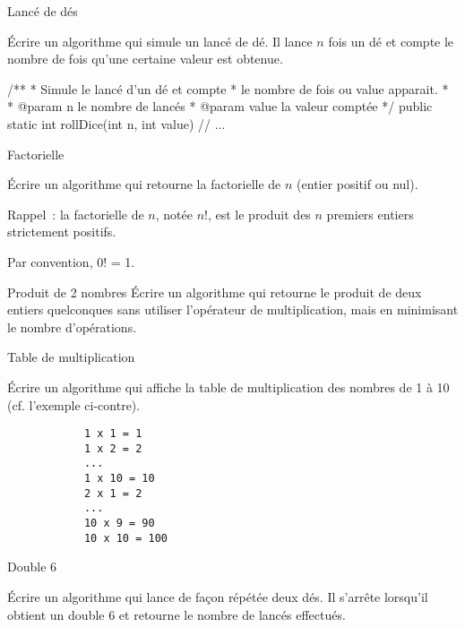 	\begin{Exercice}{Lancé de dés}

		Écrire un algorithme qui simule un lancé de dé. Il lance $n$ fois un dé
		et compte le nombre de fois qu’une certaine valeur est obtenue.

		\begin{java}
/**
 * Simule le lancé d'un dé et compte
 * le nombre de fois ou value apparait.
 * 
 * @param n le nombre de lancés
 * @param value la valeur comptée
 */
public static int rollDice(int n, int value){
	// ...
}
		\end{java}
	
	\end{Exercice}

	\begin{Exercice}{Factorielle}

		Écrire un algorithme qui retourne la factorielle de $n$ (entier positif ou
		nul). 
		
		Rappel~: la factorielle de $n$, notée $n$!, est le produit des $n$
		premiers entiers strictement positifs. 

		Par convention, 0! = 1.
	\end{Exercice}

	\begin{Exercice}{Produit de 2 nombres}
		Écrire un algorithme qui retourne le produit de deux entiers quelconques
		sans utiliser l’opérateur de multiplication, mais en minimisant le
		nombre d’opérations.
	\end{Exercice}

	\begin{Exercice}{Table de multiplication}

		\begin{minipage}[t]{10cm}
			Écrire un algorithme qui affiche la table de multiplication
			des nombres de 1 à 10
			(cf. l’exemple ci-contre).

		\end{minipage}
		\qquad
		\begin{minipage}[t]{4cm}
			\begin{verbatim}
			1 x 1 = 1
			1 x 2 = 2
			...
			1 x 10 = 10
			2 x 1 = 2
			...
			10 x 9 = 90
			10 x 10 = 100
			\end{verbatim}
		\end{minipage}		
	\end{Exercice}

	\begin{Exercice}{Double 6}

		Écrire un algorithme qui lance de façon répétée deux dés.
		Il s’arrête lorsqu’il obtient un double 6
		et retourne le nombre de lancés effectués.
	\end{Exercice}


